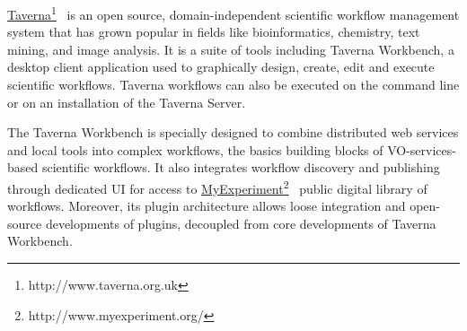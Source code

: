 \documentclass{aa}
\begin{document}
\href{http://www.taverna.org.uk}{Taverna}\footnote{http://www.taverna.org.uk}~\citep{Wolstencroft01072013} is an open source, domain-independent scientific workflow management system that has grown popular in fields like bioinformatics, chemistry, text mining, and image analysis. It is a suite of tools including Taverna Workbench, a desktop client application used to graphically design, create, edit and execute scientific workflows. Taverna workflows can also be executed on the command line or on an installation of the Taverna Server.

The Taverna Workbench is specially designed to combine distributed web services and local tools into complex workflows, the basics building blocks of VO-services-based scientific workflows. It also integrates workflow discovery and publishing through dedicated UI for access to \href{http://www.myexperiment.org}{MyExperiment}\footnote{http://www.myexperiment.org/}~\citep{Goble2010} public digital library of workflows. Moreover, its plugin architecture allows loose integration and open-source developments of plugins, decoupled from core developments of Taverna Workbench.
\end{document}
